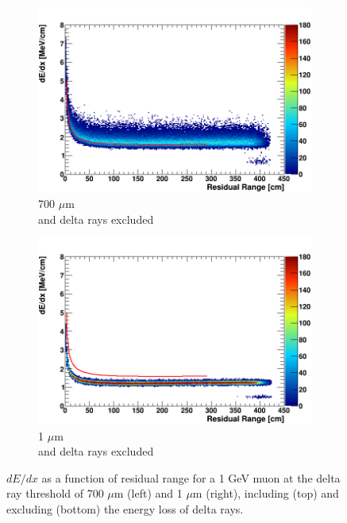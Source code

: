 \begin{figure}[t!]
\begin{subfigure}[b]{0.495\textwidth}
            \centering 
            \includegraphics[width=\textwidth]{derr_mu_only_700um}
            \caption{700 $\mu$m \\ and delta rays excluded}%
            \label{fig:derr_mu_only_700}
        \end{subfigure}
        \hfill
        \begin{subfigure}[b]{0.495\textwidth}   
            \centering 
            \includegraphics[width=\textwidth]{derr_mu_only_1um}
            \caption{1 $\mu$m \\ and delta rays excluded}%
            \label{fig:derr_mu_only_1}
        \end{subfigure}
        \caption[Energy-Residual Range of Muons at Different Delta Ray Thresholds]{
	$dE/dx$ as a function of residual range for a 1 GeV muon at the delta ray threshold of 700 $\mu$m (left) and 1 $\mu$m (right), including (top) and excluding (bottom) the energy loss of delta rays. 
	}
        \label{fig:mu_derr}
\end{figure}

